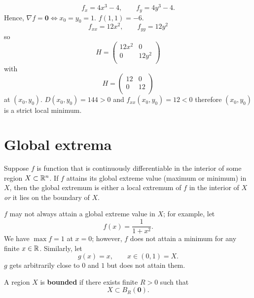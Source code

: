 \begin{solution}
    \[ f_x = 4x^3 - 4, \qquad f_y = 4y^3 - 4. \]
    Hence, $\nabla f = \bm 0 \iff x_0 = y_0 = 1$. $f(1, 1) = -6$.
    \[ f_{xx} = 12x^2, \qquad f_{yy} = 12y^2 \]
    so
    \[ H = 
        \begin{pmatrix}
            12 x^2 & 0 \\
            0 & 12 y^2 \\
        \end{pmatrix} \]
    with 
    \[ H =
        \begin{pmatrix}
            12 & 0 \\
            0 & 12 \\
        \end{pmatrix} \]
    at $(x_0, y_0)$.
    $D(x_0, y_0) = 144 > 0$ and $f_{xx}(x_0, y_0) = 12 < 0$ therefore 
    $(x_0, y_0)$
    is a strict local minimum.
\end{solution}

\section{Global extrema}

\begin{theorem}[]
    Suppose $f$ is function that is continuously differentiable 
    in the interior of some region $X \subset \mathbb{R}^n$.
    If $f$ attains its global extreme value (maximum or minimum) in $X$,
    then the global extremum is either a local extremum of
    $f$ in the interior of $X$
    \emph{or}
    it lies on the boundary of $X$.
\end{theorem}

\begin{remark}
    $f$ may not always attain a global extreme value in $X$;
    for example, let
    \[ f(x) = \frac{1}{1 + x^2}. \]
    We have $\max f = 1$ at $x = 0$; however,
    $f$ does not attain a minimum for any finite $x \in \mathbb{R}$.
    Similarly, let
    \[ g(x) = x, \qquad x \in (0, 1) = X. \]
    $g$ gets arbitrarily close to $0$ and $1$ but does not attain them.
\end{remark}

\begin{definition}[Bounded]
    A region $X$ is \textbf{bounded} if there exists finite $R > 0$
    such that
    \[ X \subset B_R(\bm 0). \]
\end{definition}
